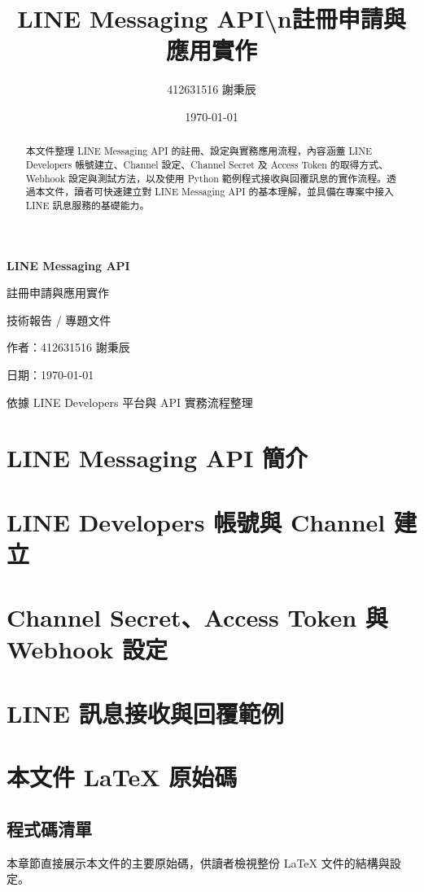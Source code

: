 \documentclass[a4paper,12pt]{report}
\title{LINE Messaging API\textbackslash{}n註冊申請與應用實作}
\author{412631516 謝秉辰}
\date{\today}
\begin{document}
\setcounter{page}{1}
\begin{titlepage}
    \centering
    \vspace*{2cm}
    {\Huge\bfseries\color{lineblue} LINE Messaging API}\par
    \vspace{1.2cm}
    {\LARGE 註冊申請與應用實作}\par
    \vspace{2cm}
    {\large 技術報告 / 專題文件}\par
    \vspace{2cm}
    {\large 作者：412631516 謝秉辰}\par
    \vspace{0.5cm}
    {\large 日期：\today}\par
    \vfill
    {\normalsize 依據 LINE Developers 平台與 API 實務流程整理}\par
\end{titlepage}

\clearpage
{}
\setcounter{page}{1}
\begin{abstract}
本文件整理 LINE Messaging API 的註冊、設定與實務應用流程，內容涵蓋 LINE Developers 帳號建立、Channel 設定、Channel Secret 及 Access Token 的取得方式、Webhook 設定與測試方法，以及使用 Python 範例程式接收與回覆訊息的實作流程。透過本文件，讀者可快速建立對 LINE Messaging API 的基本理解，並具備在專案中接入 LINE 訊息服務的基礎能力。
\end{abstract}

\tableofcontents
\listoffigures
\listoftables
\lstlistoflistings

\chapter{LINE Messaging API 簡介}


\chapter{LINE Developers 帳號與 Channel 建立}


\chapter{Channel Secret、Access Token 與 Webhook 設定}


\chapter{LINE 訊息接收與回覆範例}


\chapter{本文件 LaTeX 原始碼}
\section{程式碼清單}
本章節直接展示本文件的主要原始碼，供讀者檢視整份 LaTeX 文件的結構與設定。


\end{document}
